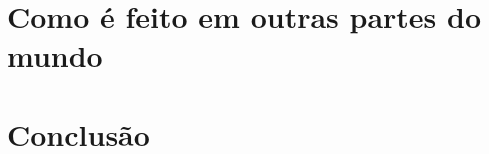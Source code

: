 \documentclass[a5paper,english,spanish,brazil]{ufsc-thesis}
\begin{document}

\chapter{Como é feito em outras partes do mundo}
\label{chap:asbuiltAbroad}
	\begin{mdframed}[hidealllines=true,backgroundcolor=blue!20]
	\lipsum
	\end{mdframed}


\chapter*[Conclusão]{Conclusão}
	\begin{mdframed}[hidealllines=true,backgroundcolor=blue!20]
	\lipsum
	\end{mdframed}



\end{document}
